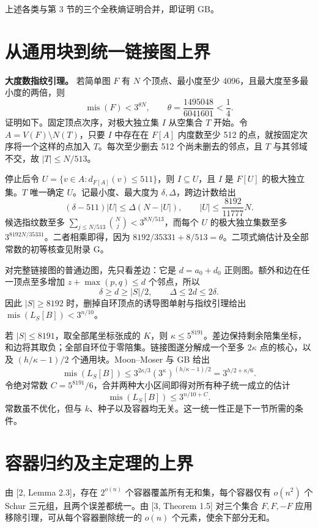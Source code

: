 \documentclass[11pt]{ctexart}
\begin{document}
上述各类与第 3 节的三个全秩熵证明合并，即证明 GB。

\section{从通用块到统一链接图上界}

\textbf{大度数指纹引理。} 若简单图 \(F\) 有 \(N\) 个顶点、最小度至少 4096，且最大度至多最小度的两倍，则
\[
 \operatorname{mis}(F)<3^{\theta N},\qquad
 \theta=\frac{1495048}{6041601}<\frac14.
\]
证明如下。固定顶点次序，对极大独立集 \(I\) 从空集合 \(T\) 开始。令 \(A=V(F)\setminus N(T)\)，只要 \(I\) 中存在在 \(F[A]\) 内度数至少 512 的点，就按固定次序将一个这样的点加入 \(T\)。每次至少删去 512 个尚未删去的邻点，且 \(T\) 与其邻域不交，故 \(|T|\le N/513\)。

停止后令 \(U=\{v\in A:d_{F[A]}(v)\le511\}\)，则 \(I\subseteq U\)，且 \(I\) 是 \(F[U]\) 的极大独立集。\(T\) 唯一确定 \(U\)。记最小度、最大度为 \(\delta,\Delta\)，跨边计数给出
\[
 (\delta-511)|U|\le\Delta(N-|U|),\qquad
 |U|\le\frac{8192}{11777}N.
\]
候选指纹数至多 \(\sum_{j\le N/513}\binom Nj<3^{8N/513}\)，而每个 \(U\) 的极大独立集数至多 \(3^{8192N/35331}\)。二者相乘即得，因为 \(8192/35331+8/513=\theta\)。二项式熵估计及全部常数的初等核查见附录 G。

对完整链接图的普通边图，先只看差边：它是 \(d=a_0+d_0\) 正则图。额外和边在任一顶点至多增加 \(z+\max(p,q)\le d\) 个邻点，所以
\[
 \delta\ge d\ge|S|/2,\qquad \Delta\le2d\le2\delta.
\]
因此 \(|S|\ge8192\) 时，删掉自环顶点的诱导图单射与指纹引理给出 \(\operatorname{mis}(L_S[B])<3^{n/10}\)。

若 \(|S|\le8191\)，取全部尾坐标张成的 \(K\)，则 \(\kappa\le5^{8191}\)。差边保持剩余陪集坐标，和边将其取负；全部自环位于零陪集。链接图遂分解成一个至多 \(2\kappa\) 点的核心，以及 \((h/\kappa-1)/2\) 个通用块。Moon--Moser 与 GB 给出
\[
 \operatorname{mis}(L_S[B])
 \le3^{2\kappa/3}(3^\kappa)^{(h/\kappa-1)/2}
 =3^{h/2+\kappa/6}.
\]
令绝对常数 \(C=5^{8191}/6\)，合并两种大小区间即得对所有种子统一成立的估计
\[
 \operatorname{mis}(L_S[B])\le3^{n/10+C}.
\]
常数虽不优化，但与 \(k\)、种子以及容器均无关。这一统一性正是下一节所需的条件。

\section{容器归约及主定理的上界}

由 [2, Lemma 2.3]，存在 \(2^{o(n)}\) 个容器覆盖所有无和集，每个容器仅有 \(o(n^2)\) 个 Schur 三元组，且两个误差都统一。由 [3, Theorem 1.5] 对三个集合 \(F,F,-F\) 应用移除引理，可从每个容器删除统一的 \(o(n)\) 个元素，使余下部分无和。
\end{document}
